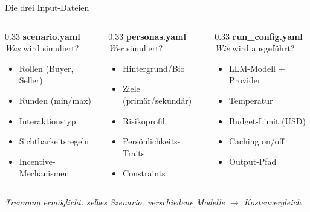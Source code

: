\documentclass[aspectratio=169, 12pt]{beamer}
\begin{document}
\begin{frame}{Die drei Input-Dateien}

\begin{columns}[T]
\begin{column}{0.33\textwidth}
\textbf{scenario.yaml}\\[4pt]
\textit{Was} wird simuliert?
\begin{itemize}\small
    \item Rollen (Buyer, Seller)
    \item Runden (min/max)
    \item Interaktionstyp
    \item Sichtbarkeitsregeln 
    \item Incentive-Mechanismen
\end{itemize}
\end{column}

\begin{column}{0.33\textwidth}
\textbf{personas.yaml}\\[4pt]
\textit{Wer} simuliert?
\begin{itemize}\small
    \item Hintergrund/Bio
    \item Ziele (prim\"ar/sekund\"ar)
    \item Risikoprofil
    \item Pers\"onlichkeits-Traits
    \item Constraints
\end{itemize}
\end{column}

\begin{column}{0.33\textwidth}
\textbf{run\_config.yaml}\\[4pt]
\textit{Wie} wird ausgeführt?
\begin{itemize}\small
    \item LLM-Modell + Provider
    \item Temperatur
    \item Budget-Limit (USD)
    \item Caching on/off
    \item Output-Pfad
\end{itemize}
\end{column}
\end{columns}

\vspace{0.5cm}
\begin{center}
\small\textit{Trennung erm\"oglicht: selbes Szenario, verschiedene Modelle $\rightarrow$ Kostenvergleich}
\end{center}

\end{frame}
\end{document}
